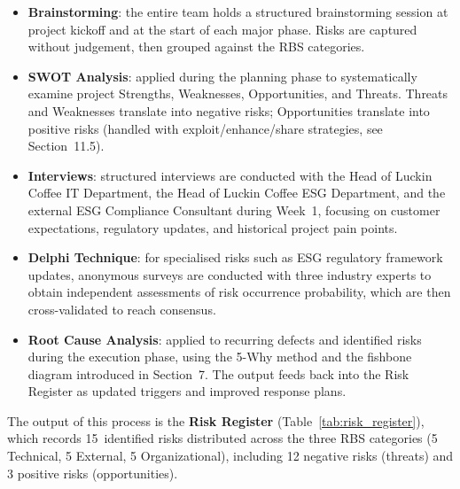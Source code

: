 \documentclass[12pt,a4paper]{article}
\begin{document}
\begin{itemize}[leftmargin=*]
    \item \textbf{Brainstorming}: the entire team holds a structured brainstorming session at project kickoff and at the start of each major phase. Risks are captured without judgement, then grouped against the RBS categories.
    \item \textbf{SWOT Analysis}: applied during the planning phase to systematically examine project Strengths, Weaknesses, Opportunities, and Threats. Threats and Weaknesses translate into negative risks; Opportunities translate into positive risks (handled with exploit/enhance/share strategies, see Section~11.5).
    \item \textbf{Interviews}: structured interviews are conducted with the Head of Luckin Coffee IT Department, the Head of Luckin Coffee ESG Department, and the external ESG Compliance Consultant during Week~1, focusing on customer expectations, regulatory updates, and historical project pain points.
    \item \textbf{Delphi Technique}: for specialised risks such as ESG regulatory framework updates, anonymous surveys are conducted with three industry experts to obtain independent assessments of risk occurrence probability, which are then cross-validated to reach consensus.
    \item \textbf{Root Cause Analysis}: applied to recurring defects and identified risks during the execution phase, using the 5-Why method and the fishbone diagram introduced in Section~7. The output feeds back into the Risk Register as updated triggers and improved response plans.
\end{itemize}

The output of this process is the \textbf{Risk Register} (Table~\ref{tab:risk_register}), which records 15~identified risks distributed across the three RBS categories (5 Technical, 5 External, 5 Organizational), including 12 negative risks (threats) and 3 positive risks (opportunities).
\end{document}
